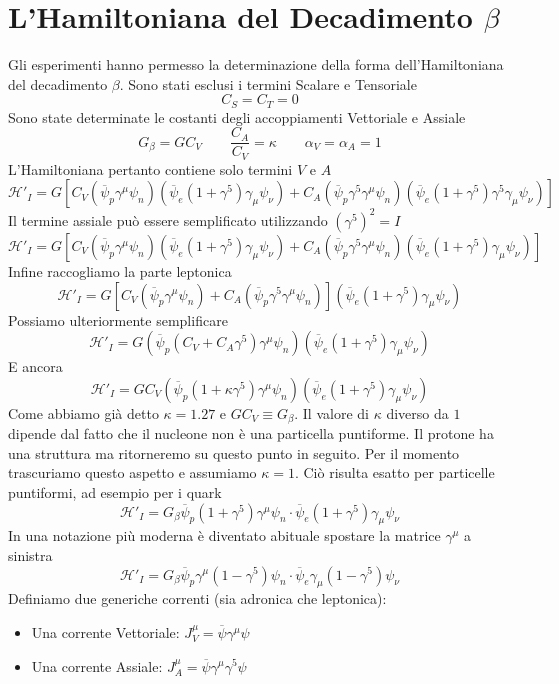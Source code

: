\section{L'Hamiltoniana del Decadimento $\beta$}
Gli esperimenti hanno permesso la determinazione della forma dell'Hamiltoniana del decadimento $\beta$. Sono stati esclusi i termini Scalare e Tensoriale
$$
C_S = C_T = 0
$$
Sono state determinate le costanti degli accoppiamenti Vettoriale e Assiale
$$
G_\beta = G C_V \qquad \frac{C_A}{C_V} = \kappa \qquad \alpha_V = \alpha_A = 1
$$
L'Hamiltoniana pertanto contiene solo termini $V$ e $A$
$$
\mathcal{H}'_I = G \left[ C_V (\overline{\psi}_p \gamma^\mu \psi_n) (\overline{\psi}_e (1 + \gamma^5) \gamma_\mu \psi_\nu) + C_A (\overline{\psi}_p \gamma^5 \gamma^\mu \psi_n) (\overline{\psi}_e (1 + \gamma^5) \gamma^5 \gamma_\mu \psi_\nu) \right]
$$
Il termine assiale può essere semplificato utilizzando $(\gamma^5)^2=I$
$$
\mathcal{H}'_I = G \left[ C_V (\overline{\psi}_p \gamma^\mu \psi_n) (\overline{\psi}_e (1 + \gamma^5) \gamma_\mu \psi_\nu) + C_A (\overline{\psi}_p \gamma^5 \gamma^\mu \psi_n) (\overline{\psi}_e (1 + \gamma^5) \gamma_\mu \psi_\nu) \right]
$$
Infine raccogliamo la parte leptonica
$$
\mathcal{H}'_I = G \left[ C_V (\overline{\psi}_p \gamma^\mu \psi_n) + C_A (\overline{\psi}_p \gamma^5 \gamma^\mu \psi_n) \right] (\overline{\psi}_e (1 + \gamma^5) \gamma_\mu \psi_\nu)
$$
Possiamo ulteriormente semplificare
$$
\mathcal{H}'_I = G (\overline{\psi}_p (C_V + C_A \gamma^5) \gamma^\mu \psi_n) (\overline{\psi}_e (1 + \gamma^5) \gamma_\mu \psi_\nu)
$$
E ancora
$$
\mathcal{H}'_I = G C_V (\overline{\psi}_p (1 + \kappa \gamma^5) \gamma^\mu \psi_n) (\overline{\psi}_e (1 + \gamma^5) \gamma_\mu \psi_\nu)
$$
Come abbiamo già detto $\kappa=1.27$ e $GC_V\equiv G_\beta$. Il valore di $\kappa$ diverso da $1$ dipende dal fatto che il nucleone non è una particella puntiforme. Il protone ha una struttura ma ritorneremo su questo punto in seguito. Per il momento trascuriamo questo aspetto e assumiamo $\kappa=1$. Ciò risulta esatto per particelle puntiformi, ad esempio per i quark
$$
\mathcal{H}'_I = G_\beta \overline{\psi}_p (1 + \gamma^5) \gamma^\mu \psi_n \cdot \overline{\psi}_e (1 + \gamma^5) \gamma_\mu \psi_\nu
$$
In una notazione più moderna è diventato abituale spostare la matrice $\gamma^\mu$ a sinistra
$$
\mathcal{H}'_I = G_\beta \overline{\psi}_p \gamma^\mu (1 - \gamma^5) \psi_n \cdot \overline{\psi}_e \gamma_\mu (1 - \gamma^5) \psi_\nu
$$
Definiamo due generiche correnti (sia adronica che leptonica):
\begin{itemize}
	\item Una corrente Vettoriale: $J_V^\mu = \overline{\psi} \gamma^\mu \psi$
	\item Una corrente Assiale: $J_A^\mu = \overline{\psi} \gamma^\mu \gamma^5 \psi$
\end{itemize}
